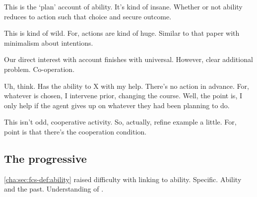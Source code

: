\begin{note}
  This is the `plan' account of ability.
  It's kind of insane.
  Whether or not ability reduces to action such that choice and secure outcome.
\end{note}

\begin{note}
  This is kind of wild.
  For, actions are kind of huge.
  Similar to that paper with minimalism about intentions.
\end{note}

\begin{note}
  Our direct interest with account finishes with universal.
  However, clear additional problem.
  Co-operation.
\end{note}

\begin{note}
  Uh, think.
  Has the ability to X with my help.
  There's no action in advance.
  For, whatever is chosen, I intervene prior, changing the course.
  Well, the point is, I only help if the agent gives up on whatever they had been planning to do.

  This isn't odd, cooperative activity.
  So, actually, refine example a little.
  For, point is that there's the cooperation condition.
\end{note}

\subsection{The progressive}
\label{cha:sec:fcs-def:progressive}

\begin{note}
  \autoref{cha:sec:fcs-def:ability} raised difficulty with linking  to ability.
  Specific.
  Ability and the past.
  Understanding of \AbControl{}.
\end{note}

